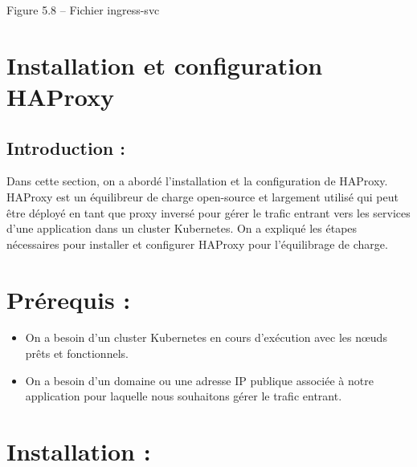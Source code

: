 \begin{center}
Figure 5.8 – Fichier ingress-svc
\end{center}

\section*{Installation et configuration HAProxy}

\subsection*{Introduction :}

Dans cette section, on a abordé l’installation et la configuration de HAProxy. HAProxy est un équilibreur de charge open-source et largement utilisé qui peut être déployé en tant que proxy inversé pour gérer le trafic entrant vers les services d’une application dans un cluster Kubernetes. On a expliqué les étapes nécessaires pour installer et configurer HAProxy pour l’équilibrage de charge.
\section*{Prérequis :}

\begin{itemize}
\item On a besoin d’un cluster Kubernetes en cours d’exécution avec les nœuds prêts et fonctionnels.
\item On a besoin d’un domaine ou une adresse IP publique associée à notre application pour laquelle nous souhaitons gérer le trafic entrant.
\end{itemize}

\section*{Installation :}

